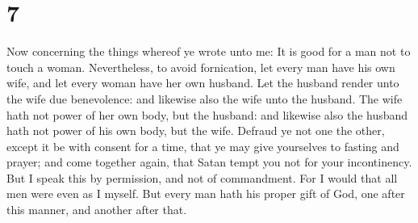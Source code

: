 \hypertarget{section-6}{%
\section{7}\label{section-6}}

 Now concerning the things whereof ye wrote unto me: It is
good for a man not to touch a woman.  Nevertheless, to
avoid fornication, let every man have his own wife, and let every woman
have her own husband.  Let the husband render unto the
wife due benevolence: and likewise also the wife unto the husband.
 The wife hath not power of her own body, but the husband:
and likewise also the husband hath not power of his own body, but the
wife.  Defraud ye not one the other, except it be with
consent for a time, that ye may give yourselves to fasting and prayer;
and come together again, that Satan tempt you not for your incontinency.
 But I speak this by permission, and not of commandment.
 For I would that all men were even as I myself. But every
man hath his proper gift of God, one after this manner, and another
after that.

